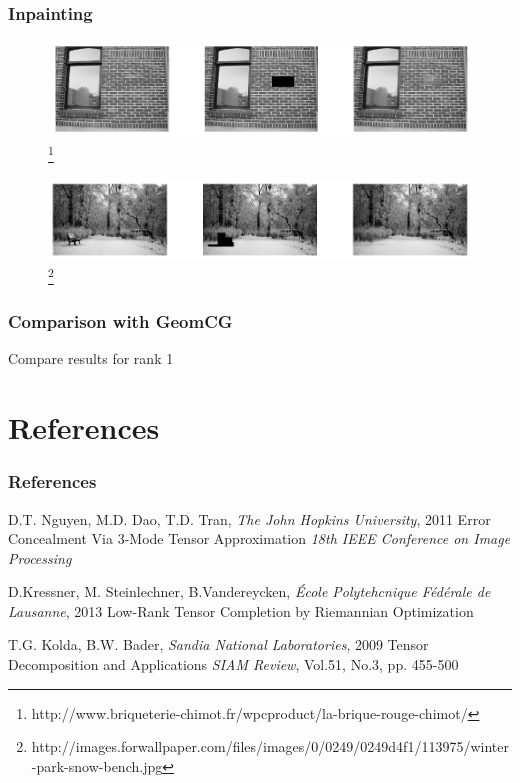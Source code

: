 \documentclass{beamer}
\begin{document}
\begin{frame}
\frametitle{Inpainting}
\begin{figure}
\includegraphics[width=1\linewidth]{InpaintingFacade.png}\footnote{\tiny{http://www.briqueterie-chimot.fr/wpcproduct/la-brique-rouge-chimot/}}
\end{figure}
\begin{figure}
\includegraphics[width=1\linewidth]{InpaintingSnow.png}\footnote{\tiny{http://images.forwallpaper.com/files/images/0/0249/0249d4f1/113975/winter-park-snow-bench.jpg}}
\end{figure}
\end{frame}

\begin{frame}
\frametitle{Comparison with GeomCG}
Compare results for rank 1
\end{frame}

\section*{References}
\begin{frame}
\frametitle{References}
\footnotesize{
\begin{thebibliography}{99} %
\bibitem[ALS]{} D.T. Nguyen, M.D. Dao, T.D. Tran, \textit{The John Hopkins University}, 2011
\newblock Error Concealment Via 3-Mode Tensor Approximation
\newblock \emph{18th IEEE Conference on Image Processing}

\bibitem[GeomCG]{} D.Kressner, M. Steinlechner, B.Vandereycken, \textit{\'Ecole Polytehcnique F\'ed\'erale de Lausanne}, 2013
\newblock Low-Rank Tensor Completion by Riemannian Optimization

 T.G. Kolda, B.W. Bader, \textit{Sandia National Laboratories}, 2009
\newblock Tensor Decomposition and Applications
\newblock \emph{SIAM Review}, Vol.51, No.3, pp. 455-500
\end{thebibliography}
}
\end{frame}
\end{document}
